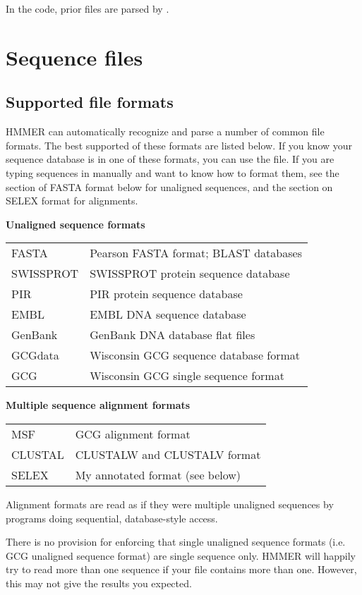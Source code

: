 In the code, prior files are parsed by .

\section {Sequence files}

\subsection{Supported file formats}
 
HMMER can automatically recognize and parse a number of common file
formats. The best supported of these formats are listed below. If you
know your sequence database is in one of these formats, you can use
the file.  If you are typing sequences in manually and want to know
how to format them, see the section of FASTA format below for
unaligned sequences, and the section on SELEX format for alignments.

\textbf{Unaligned sequence formats}
\begin{tabular}{ll}
FASTA     & Pearson FASTA format; BLAST databases \\
SWISSPROT & SWISSPROT protein sequence database\\ 
PIR       & PIR protein sequence database \\
EMBL      & EMBL DNA sequence database \\
GenBank   & GenBank DNA database flat files\\
GCGdata   & Wisconsin GCG sequence database format \\
GCG       & Wisconsin GCG single sequence format \\
\end{tabular}

\textbf{Multiple sequence alignment formats}
\begin{tabular}{ll}
MSF     &   GCG alignment format \\
CLUSTAL &   CLUSTALW and CLUSTALV format \\
SELEX   &   My annotated format (see below)\\
\end{tabular}

Alignment formats are read as if they were multiple unaligned
sequences by programs doing sequential, database-style access.

There is no provision for enforcing that single unaligned sequence
formats (i.e. GCG unaligned sequence format) are single sequence
only. HMMER will happily try to read more than one sequence if your
file contains more than one. However, this may not give the results
you expected.

